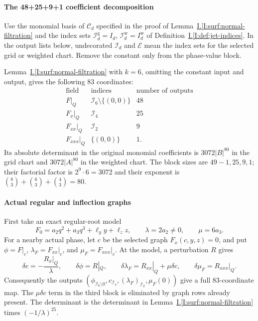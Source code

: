 \documentclass[11pt]{amsart}
\theoremstyle{definition}
\theoremstyle{remark}
\numberwithin{equation}{section}
\newcommand{\partIref}[1]{\hyperref[I:#1]{I.\ref*{I:#1}}}
\begin{document}
\paragraph{The 48+25+9+1 coefficient decomposition}
Use the monomial basis of $\mathcal C_d$ specified in the proof of Lemma~\partIref{surf:normal-filtration} and the index sets $\mathcal I_d^{\mathrm g}=I_d$, $\mathcal I_d^{\mathrm w}=I_d^{\mathrm w}$ of Definition~\partIref{def:jet-indices}. In the output lists below, undecorated $\mathcal I_d$ and $\mathcal E$ mean the index sets for the selected grid or weighted chart. Remove the constant only from the phase-value block.

Lemma~\partIref{surf:normal-filtration} with $k=6$, omitting the constant input and output, gives the following $83$ coordinates:
\[
 \begin{array}{c|c|c}
 \text{field}&\text{indices}&\text{number of outputs}\\ \hline
F|_Q&\mathcal I_6\setminus\{(0,0)\}&48\\
F_x|_Q&\mathcal I_4&25\\
F_{xx}|_Q&\mathcal I_2&9\\
F_{xxx}|_Q&\{(0,0)\}&1.
 \end{array}
\]
Its absolute determinant in the original monomial coefficients is $3072|B|^{80}$ in the grid chart and $3072|A|^{80}$ in the weighted chart.
The block sizes are $49-1,25,9,1$; their factorial factor is $2^9\cdot6=3072$ and their exponent is $\binom83+\binom63+\binom43=80$.

\paragraph{Actual regular and inflection graphs}
First take an exact regular-root model
\[
F_0=a_2q^2+a_3q^3+\ell_y y+\ell_z z,\qquad \lambda=2a_2\ne0,\qquad \mu=6a_3.
\]
For a nearby actual phase, let $c$ be the selected graph $F_x(c,y,z)=0$, and put $\phi=F|_c$, $\lambda_F=F_{xx}|_c$, and $\mu_F=F_{xxx}|_c$. At the model, a perturbation $R$ gives
\begin{equation}\label{low:6:nc36:regular-variation}
 \delta c=-\frac{R_x|_Q}{\lambda},\qquad
 \delta\phi=R|_Q,\qquad
 \delta\lambda_F=R_{xx}|_Q+\mu\delta c,\qquad
 \delta\mu_F=R_{xxx}|_Q.
\end{equation}
Consequently the outputs $(\phi_{\mathcal I_6\setminus0},c_{\mathcal I_4},(\lambda_F)_{\mathcal I_2},\mu_F(0))$ give a full $83$-coordinate map. The $\mu\delta c$ term in the third block is eliminated by graph rows already present. The determinant is the determinant in Lemma~\partIref{surf:normal-filtration} times $(-1/\lambda)^{25}$.
\end{document}
